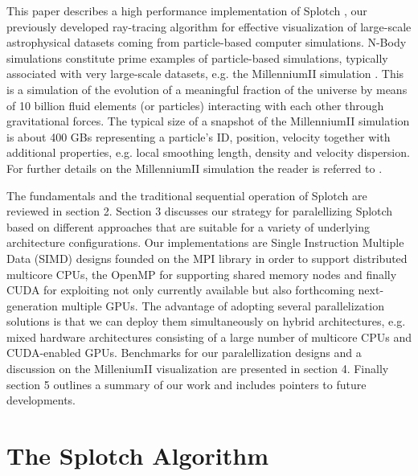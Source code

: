 This paper describes a high performance implementation of
Splotch \cite{2008NJPh...10l5006D}, our previously developed
ray-tracing algorithm for effective visualization of large-scale
astrophysical datasets coming from particle-based computer
simulations. N-Body simulations constitute prime examples of
particle-based simulations, typically associated with very large-scale
datasets, e.g. the MillenniumII
simulation \cite{2009MNRAS.398.1150B}. This is a simulation of the
evolution of a meaningful fraction of the universe by means of 10
billion fluid elements (or particles) interacting with each other
through gravitational forces. The typical size of a snapshot of the
MillenniumII simulation is about 400 GBs representing a particle's ID,
position, velocity together with additional properties, e.g. local
smoothing length, density and velocity dispersion. For further details
on the MillenniumII simulation the reader is referred
to \cite{2009MNRAS.398.1150B}.

The fundamentals and the traditional sequential operation of
Splotch \cite{2008NJPh...10l5006D} are reviewed in section 2. Section
3 discusses our strategy for paralellizing Splotch based on different
approaches that are suitable for a variety of underlying architecture
configurations. Our implementations are Single Instruction Multiple
Data (SIMD) designs founded on the MPI library \cite{mpi} in order to
support distributed multicore CPUs, the OpenMP \cite{openmp} for
supporting shared memory nodes and finally CUDA \cite{cuda} for
exploiting not only currently available but also forthcoming
next-generation multiple GPUs. The advantage of adopting several
parallelization solutions is that we can deploy them simultaneously on
hybrid architectures, e.g. mixed hardware architectures consisting of
a large number of multicore CPUs and CUDA-enabled GPUs. Benchmarks for
our paralellization designs and a discussion on the MilleniumII
visualization are presented in section 4. Finally section 5 outlines a
summary of our work and includes pointers to future developments. 


\section{The Splotch Algorithm}
\label{splotch}

